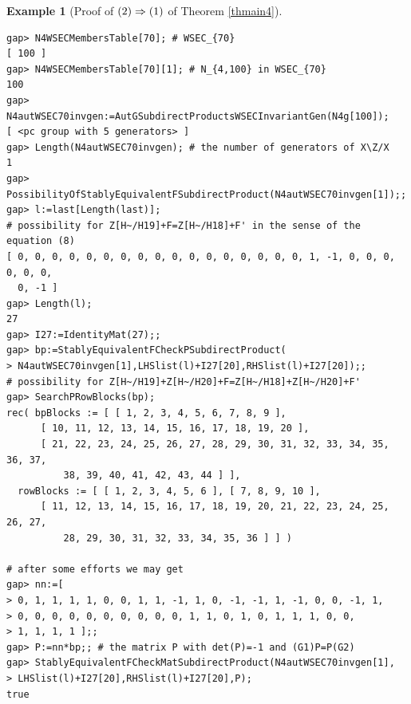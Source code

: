 \documentclass{amsart}
\theoremstyle{plain}
\theoremstyle{definition}
\newtheorem{example}[theorem]{Example}
\theoremstyle{remark}
\begin{document}
\begin{example}[Proof of ${\rm (2)}\Rightarrow {\rm (1)}$ of {Theorem \ref{thmain4}}]
\begin{verbatim}
gap> N4WSECMembersTable[70]; # WSEC_{70}
[ 100 ]
gap> N4WSECMembersTable[70][1]; # N_{4,100} in WSEC_{70}
100
gap> N4autWSEC70invgen:=AutGSubdirectProductsWSECInvariantGen(N4g[100]);
[ <pc group with 5 generators> ]
gap> Length(N4autWSEC70invgen); # the number of generators of X\Z/X
1
gap> PossibilityOfStablyEquivalentFSubdirectProduct(N4autWSEC70invgen[1]);;
gap> l:=last[Length(last)]; 
# possibility for Z[H~/H19]+F=Z[H~/H18]+F' in the sense of the equation (8)
[ 0, 0, 0, 0, 0, 0, 0, 0, 0, 0, 0, 0, 0, 0, 0, 0, 0, 1, -1, 0, 0, 0, 0, 0, 0, 
  0, -1 ]
gap> Length(l);
27
gap> I27:=IdentityMat(27);;
gap> bp:=StablyEquivalentFCheckPSubdirectProduct(
> N4autWSEC70invgen[1],LHSlist(l)+I27[20],RHSlist(l)+I27[20]);;
# possibility for Z[H~/H19]+Z[H~/H20]+F=Z[H~/H18]+Z[H~/H20]+F' 
gap> SearchPRowBlocks(bp);
rec( bpBlocks := [ [ 1, 2, 3, 4, 5, 6, 7, 8, 9 ], 
      [ 10, 11, 12, 13, 14, 15, 16, 17, 18, 19, 20 ], 
      [ 21, 22, 23, 24, 25, 26, 27, 28, 29, 30, 31, 32, 33, 34, 35, 36, 37, 
          38, 39, 40, 41, 42, 43, 44 ] ], 
  rowBlocks := [ [ 1, 2, 3, 4, 5, 6 ], [ 7, 8, 9, 10 ], 
      [ 11, 12, 13, 14, 15, 16, 17, 18, 19, 20, 21, 22, 23, 24, 25, 26, 27, 
          28, 29, 30, 31, 32, 33, 34, 35, 36 ] ] )

# after some efforts we may get 
gap> nn:=[ 
> 0, 1, 1, 1, 1, 0, 0, 1, 1, -1, 1, 0, -1, -1, 1, -1, 0, 0, -1, 1,
> 0, 0, 0, 0, 0, 0, 0, 0, 0, 0, 1, 1, 0, 1, 0, 1, 1, 1, 0, 0,
> 1, 1, 1, 1 ];;
gap> P:=nn*bp;; # the matrix P with det(P)=-1 and (G1)P=P(G2)
gap> StablyEquivalentFCheckMatSubdirectProduct(N4autWSEC70invgen[1],
> LHSlist(l)+I27[20],RHSlist(l)+I27[20],P);
true


\end{verbatim}
\end{example}
\end{document}
